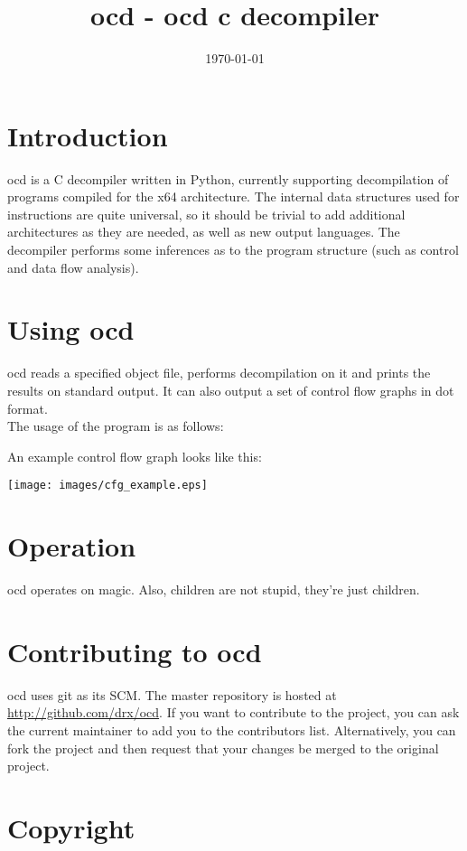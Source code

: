\documentclass[leqno,11pt]{article}
\title{ocd - ocd c decompiler}
\date{\today}
\begin{document}
\maketitle

\tableofcontents

\newpage

\section{Introduction}

ocd is a C decompiler written in Python, currently supporting decompilation of programs compiled for the x64 architecture. The internal data structures used for instructions are quite universal, so it should be trivial to add additional architectures as they are needed, as well as new output languages. The decompiler performs some inferences as to the program structure (such as control and data flow analysis).

\section{Using ocd}

ocd reads a specified object file, performs decompilation on it and prints the results on standard output. It can also output a set of control flow graphs in dot format. 
\\ The usage of the program is as follows:



An example control flow graph looks like this:

\texttt{[image: images/cfg\_example.eps]}

\section{Operation}

ocd operates on magic. Also, children are not stupid, they're just children.

\section{Contributing to ocd}

ocd uses git as its SCM. The master repository is hosted at \url{http://github.com/drx/ocd}. If you want to contribute to the project, you can ask the current maintainer to add you to the contributors list. Alternatively, you can fork the project and then request that your changes be merged to the original project.

\section{Copyright}


\end{document}

